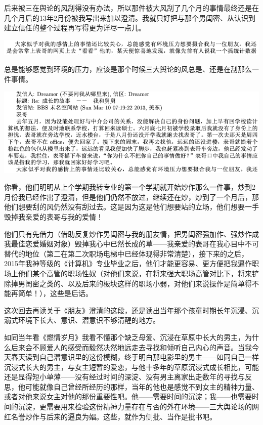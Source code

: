 \documentclass[9pt, b5paper]{article}
\begin{document}
后来被三在舆论的风刮得没有办法，所以那件被大风刮了几个月的事情最终还是在几个月后的13年2月份被我写出来加以澄清。我就只好把与那个男闺密、从认识到建立信任的整个过程再写得更为详尽一点儿。

\begin{center}
\includegraphics[width=.9\linewidth]{./pic/backups_plans_20210424_113449.png}
\end{center}

总是能够感觉到环境的压力，应该是那个时候三大舆论的风总是、还是在刮那么一件事情。

\begin{center}
\includegraphics[width=.9\linewidth]{./pic/backups_plans_20210501_093920.png}
\end{center}

你看，他们明明从上个学期我转专业的第一个学期就开始炒作那么一件事，炒到2月份我已经作出了澄清，但是他们仍然不放过，继续还在炒，炒到了一个月后，那他们想要刮的风仍然没有刮过去。这是因为这是他们想要站的立场，他们想要一手毁掉我亲爱的表哥与我的爱情！

他们只有先借力（借助反复炒作男闺密与我的朋友情，把男闺密强加作、强炒作成我最佳恋爱婚姻对象）毁掉我心中已然长成的草——我亲爱的表哥在我心目中不可替代的地位（第二在第二次职场电梯中已经体现得非常清楚），接下来的之后，2015年我神等级的《计算机》专业毕业之后，他们才能更容易、更方便把我逼作职场上他们某个高管的职场性奴（对他们来说，在将来强大职场高管对比下，将来铲除掉男闺密之类的、以及后来的板块这样的职场小弱，对他们来说操作是简单得不能再简单！），这些是后话。 

这次回去再读关于《朋友》澄清的这段，还是读出当年那个孩童时期长年沉浸、沉溺式环境下长大、意识、潜意识不够清醒的地方。

如同当年看《燃情岁月》我看不懂那个缺乏母爱、沉浸在草原中长大的男主，为什么后来会不顾爱人的感受而毅然决然地远走去寻找和倾听自己内心的声音。当我今天春天读到自己潜意识里的这份模糊，终于明白那电影里的男主——如同自己一样沉浸式长大的男主，与女主短暂的爱恋，与他十多年的草原沉浸式成长相比，可能还是显得短小单薄——没有经过时间的深淀、没有男主离家出走数年的寻找与反思，他可能就像自己曾经所经历的那样，当年的他也是感觉不到女主的精神力量、或者对他来说女主对他的那份重要性吧。他——需要时间的沉淀；我——也需要时间的沉淀，更需要用来检验这份精神力量存在与否的外在环境——三大舆论场的网红名誉炒作与后来的逼良为娼。这些，就作为侧批、当作是批书吧。
\end{document}
